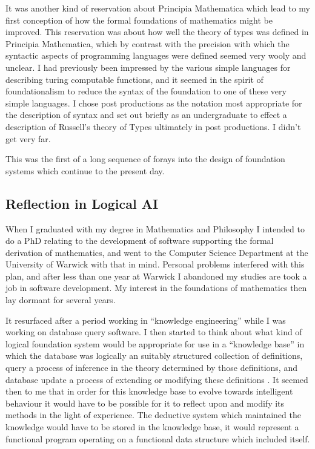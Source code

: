 \documentclass[numreferences]{rbjk}
\begin{document}
\begin{article}
It was another kind of reservation about Principia Mathematica which lead to my first conception of how the formal foundations of mathematics might be improved.
This reservation was about how well the theory of types was defined in Principia Mathematica, which by contrast with the precision with which the syntactic aspects of programming languages were defined seemed very wooly and unclear.
I had previously been impressed by the various simple languages for describing turing computable functions, and it seemed in the spirit of foundationalism to reduce the syntax of the foundation to one of these very simple languages.
I chose post productions as the notation most appropriate for the description of syntax and set out briefly as an undergraduate to effect a description of Russell's theory of Types ultimately in post productions.
I didn't get very far.

This was the first of a long sequence of forays into the design of foundation systems which continue to the present day.

\subsection{Reflection in Logical AI}

When I graduated with my degree in Mathematics and Philosophy I intended to do a PhD relating to the development of software supporting the formal derivation of mathematics, and went to the Computer Science Department at the University of Warwick with that in mind.
Personal problems interfered with this plan, and after less than one year at Warwick I abandoned my studies are took a job in software development.
My interest in the foundations of mathematics then lay dormant for several years.

It resurfaced after a period working in ``knowledge engineering'' \cite{jones82} while I was working on database query software.
I then started to think about what kind of logical foundation system would be appropriate for use in a ``knowledge base'' in which the database was logically an suitably structured collection of definitions, query a process of inference in the theory determined by those definitions, and database update a process of extending or modifying these definitions \cite{jones85}.
It seemed then to me that in order for this knowledge base to evolve towards intelligent behaviour it would have to be possible for it to reflect upon and modify its methods in the light of experience.
The deductive system which maintained the knowledge would have to be stored in the knowledge base, it would represent a functional program operating on a functional data structure which included itself.


\end{article}
\end{document}
